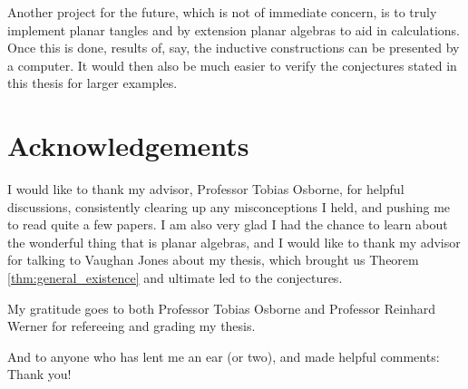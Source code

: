 Another project for the future, which is not of immediate concern, is to truly implement planar tangles and by extension planar algebras to aid in calculations. Once this is done, results of, say, the inductive constructions can be presented by a computer. It would then also be much easier to verify the conjectures stated in this thesis for larger examples.

\section*{\textbf{Acknowledgements}}
I would like to thank my advisor, Professor Tobias Osborne, for helpful discussions, consistently clearing up any misconceptions I held, and pushing me to read quite a few papers. I am also very glad I had the chance to learn about the wonderful thing that is planar algebras, and I would like to thank my advisor for talking to Vaughan Jones about my thesis, which brought us \textsf{Theorem \ref{thm:general_existence}} and ultimate led to the conjectures.

My gratitude goes to both Professor Tobias Osborne and Professor Reinhard Werner for refereeing and grading my thesis.

And to anyone who has lent me an ear (or two), and made helpful comments: Thank you!